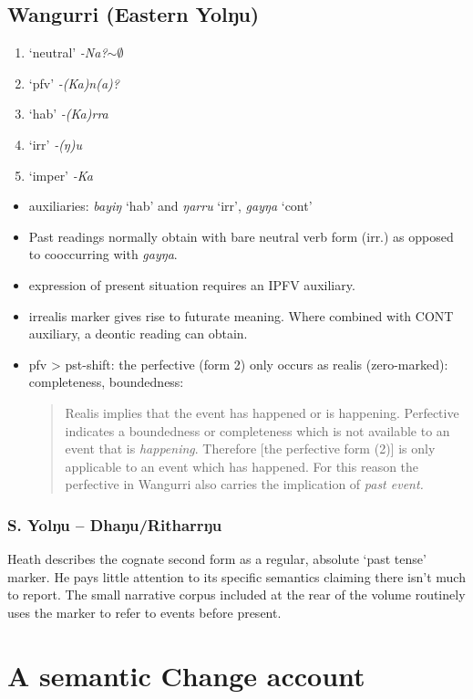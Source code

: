 \documentclass[11pt]{article}
\begin{document}
\subsection*{Wangurri (Eastern Yolŋu)}
\begin{enumerate}[1]
\item `neutral' \textit{-Na?$\sim\emptyset$}
\item `pfv' \textit{-(Ka)n(a)?}
\item `hab' \textit{-(Ka)rra}
\item `irr' \textit{-(ŋ)u}
\item `imper' \textit{-Ka}
\end{enumerate}
\begin{itemize}
\item auxiliaries: \textit{bayiŋ} `hab' and \textit{ŋarru} `irr', \textit{gayŋa} `cont'

\item Past readings normally obtain with bare neutral verb form (irr.) as opposed to cooccurring with \textit{gayŋa}.
\item expression of present situation requires an IPFV auxiliary.
\item irrealis marker gives rise to futurate meaning. Where combined with CONT auxiliary, a deontic reading can obtain.
\item {\sc pfv > pst}-shift: the perfective (form 2) only occurs as realis (zero-marked): completeness, boundedness:
\begin{quotation}
Realis implies that the event has happened or is happening. Perfective indicates a boundedness or completeness which is not available to an event that is \textit{happening}. Therefore [the perfective form (2)] is only applicable to an event which has happened. For this reason the perfective in Wangurri also carries the implication of \textit{past event.}
\end{quotation}
\end{itemize}

\subsubsection*{S. Yolŋu -- Dhaŋu/Ritharrŋu}
Heath describes the cognate second form as a regular, absolute `past tense' marker. He pays little attention to its specific semantics claiming there isn't much to report. The small narrative corpus included at the rear of the volume routinely uses the marker to refer to events before present.
\section*{A semantic Change account}
\end{document}
